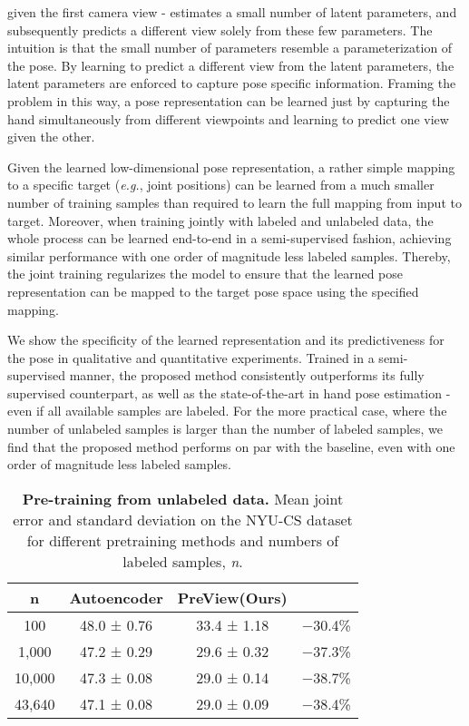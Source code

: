 \documentclass[10pt,twocolumn,letterpaper]{article}
\begin{document}
given the first camera view - estimates a small number of latent
parameters, and subsequently predicts a different view
solely from these few parameters. The intuition is that the
small number of parameters resemble a parameterization of
the pose. By learning to predict a different view from the
latent parameters, the latent parameters are enforced to capture
pose specific information. Framing the problem in this
way, a pose representation can be learned just by capturing
the hand simultaneously from different viewpoints and
learning to predict one view given the other.\par
Given the learned low-dimensional pose representation,
a rather simple mapping to a specific target (\emph{e.g.}, joint positions)
can be learned from a much smaller number of training
samples than required to learn the full mapping from
input to target. Moreover, when training jointly with labeled
and unlabeled data, the whole process can be learned
end-to-end in a semi-supervised fashion, achieving similar
performance with one order of magnitude less labeled samples.
Thereby, the joint training regularizes the model to
ensure that the learned pose representation can be mapped
to the target pose space using the specified mapping.\par
We show the specificity of the learned representation and
its predictiveness for the pose in qualitative and quantitative
experiments. Trained in a semi-supervised manner, the proposed
method consistently outperforms its fully supervised
counterpart, as well as the state-of-the-art in hand pose estimation
- even if all available samples are labeled. For the
more practical case, where the number of unlabeled samples
is larger than the number of labeled samples, we find
that the proposed method performs on par with the baseline,
even with one order of magnitude less labeled samples.\par

\begin{table}
\begin{center}
\caption{\textbf{Pre-training from unlabeled data.} Mean joint error
and standard deviation on the NYU-CS dataset for different pretraining
methods and numbers of labeled samples, \emph{n}.}
\begin{tabular}{cccc}
\toprule
n & Autoencoder & PreView(Ours) & \\
\midrule
100 & 48.0 ± 0.76 & 33.4 ± 1.18 & −30.4\% \\
1,000 & 47.2 ± 0.29 & 29.6 ± 0.32 & −37.3\% \\
10,000 & 47.3 ± 0.08 & 29.0 ± 0.14 & −38.7\% \\
43,640 & 47.1 ± 0.08 & 29.0 ± 0.09 & −38.4\% \\
\bottomrule
\end{tabular}
\label{Tab:Experiment}
\end{center}
\end{table}
\end{document}
